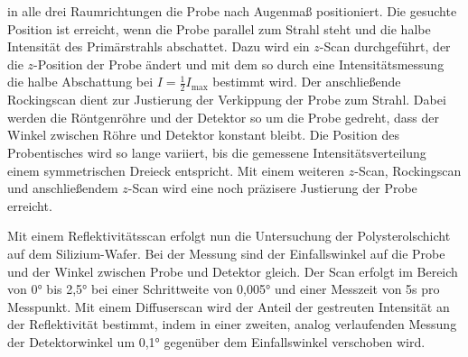 in alle drei Raumrichtungen die Probe nach Augenmaß positioniert. Die gesuchte Position ist erreicht, wenn 
die Probe parallel zum Strahl steht und die halbe Intensität des Primärstrahls abschattet. Dazu wird ein
$z$-Scan durchgeführt, der die $z$-Position der Probe ändert und mit dem so durch eine Intensitätsmessung 
die halbe Abschattung bei $I = \frac{1}{2} I_\text{max}$ bestimmt wird. Der anschließende Rockingscan
dient zur Justierung der Verkippung der Probe zum Strahl. Dabei werden die Röntgenröhre und der Detektor 
so um die Probe gedreht, dass der Winkel zwischen Röhre und Detektor konstant bleibt. Die Position des 
Probentisches wird so lange variiert, bis die gemessene Intensitätsverteilung einem symmetrischen Dreieck 
entspricht. Mit einem weiteren $z$-Scan, Rockingscan und anschließendem $z$-Scan wird eine noch präzisere 
Justierung der Probe erreicht. 

Mit einem Reflektivitätsscan erfolgt nun die Untersuchung der Polysterolschicht auf dem Silizium-Wafer. 
Bei der Messung sind der Einfallswinkel auf die Probe und der Winkel zwischen Probe und Detektor gleich.
Der Scan erfolgt im Bereich von 0° bis 2,5° bei einer Schrittweite von 0,005° und einer Messzeit von 
5s pro Messpunkt. Mit einem Diffuserscan wird der Anteil der gestreuten Intensität an der Reflektivität
bestimmt, indem in einer zweiten, analog verlaufenden Messung der Detektorwinkel um 0,1° gegenüber dem 
Einfallswinkel verschoben wird.